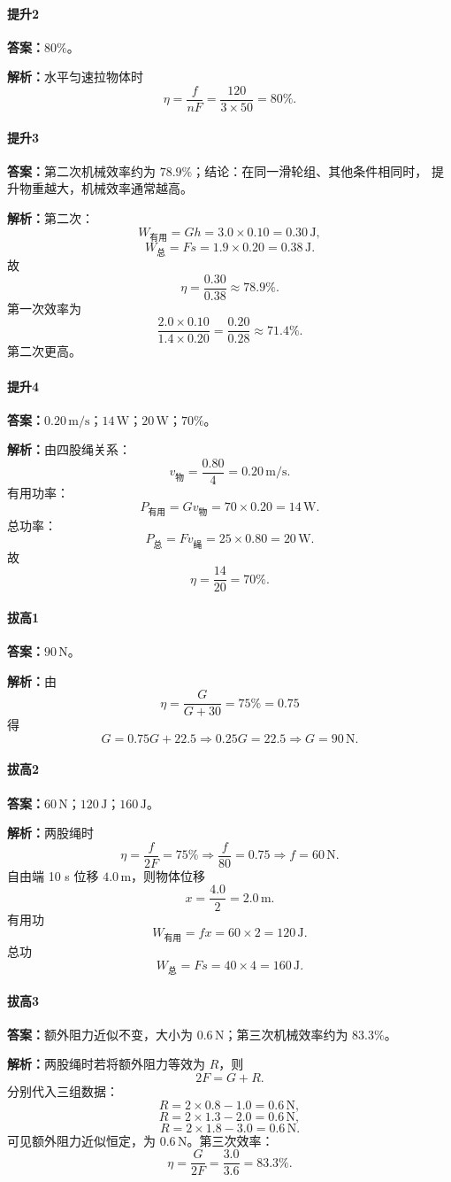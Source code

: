 \documentclass[12pt,a4paper]{ctexart}
\newcommand{\Ans}[1]{\par\noindent\textbf{答案：}#1\par}
\newcommand{\Sol}[1]{\par\noindent\textbf{解析：}#1\par}
\begin{document}
\paragraph{提升2}
\Ans{$80\%$。}
\Sol{水平匀速拉物体时
\[
\eta=\frac{f}{nF}=\frac{120}{3\times 50}=80\%.
\]}

\paragraph{提升3}
\Ans{第二次机械效率约为 $78.9\%$；结论：在同一滑轮组、其他条件相同时，
提升物重越大，机械效率通常越高。}
\Sol{第二次：
\[
W_{\text{有用}}=Gh=3.0\times 0.10=0.30\,\mathrm{J},
\]
\[
W_{\text{总}}=Fs=1.9\times 0.20=0.38\,\mathrm{J}.
\]
故
\[
\eta=\frac{0.30}{0.38}\approx 78.9\%.
\]
第一次效率为
\[
\frac{2.0\times 0.10}{1.4\times 0.20}=\frac{0.20}{0.28}\approx 71.4\%.
\]
第二次更高。}

\paragraph{提升4}
\Ans{$0.20\,\mathrm{m/s}$；$14\,\mathrm{W}$；$20\,\mathrm{W}$；$70\%$。}
\Sol{由四股绳关系：
\[
v_{\text{物}}=\frac{0.80}{4}=0.20\,\mathrm{m/s}.
\]
有用功率：
\[
P_{\text{有用}}=Gv_{\text{物}}=70\times 0.20=14\,\mathrm{W}.
\]
总功率：
\[
P_{\text{总}}=Fv_{\text{绳}}=25\times 0.80=20\,\mathrm{W}.
\]
故
\[
\eta=\frac{14}{20}=70\%.
\]}

\paragraph{拔高1}
\Ans{$90\,\mathrm{N}$。}
\Sol{由
\[
\eta=\frac{G}{G+30}=75\%=0.75
\]
得
\[
G=0.75G+22.5
\Rightarrow 0.25G=22.5
\Rightarrow G=90\,\mathrm{N}.
\]}

\paragraph{拔高2}
\Ans{$60\,\mathrm{N}$；$120\,\mathrm{J}$；$160\,\mathrm{J}$。}
\Sol{两股绳时
\[
\eta=\frac{f}{2F}=75\%
\Rightarrow \frac{f}{80}=0.75
\Rightarrow f=60\,\mathrm{N}.
\]
自由端 10 s 位移 $4.0\,\mathrm{m}$，则物体位移
\[
x=\frac{4.0}{2}=2.0\,\mathrm{m}.
\]
有用功
\[
W_{\text{有用}}=fx=60\times 2=120\,\mathrm{J}.
\]
总功
\[
W_{\text{总}}=Fs=40\times 4=160\,\mathrm{J}.
\]}

\paragraph{拔高3}
\Ans{额外阻力近似不变，大小为 $0.6\,\mathrm{N}$；第三次机械效率约为 $83.3\%$。}
\Sol{两股绳时若将额外阻力等效为 $R$，则
\[
2F=G+R.
\]
分别代入三组数据：
\[
R=2\times 0.8-1.0=0.6\,\mathrm{N},
\]
\[
R=2\times 1.3-2.0=0.6\,\mathrm{N},
\]
\[
R=2\times 1.8-3.0=0.6\,\mathrm{N}.
\]
可见额外阻力近似恒定，为 $0.6\,\mathrm{N}$。第三次效率：
\[
\eta=\frac{G}{2F}=\frac{3.0}{3.6}=83.3\%.
\]}
\end{document}
